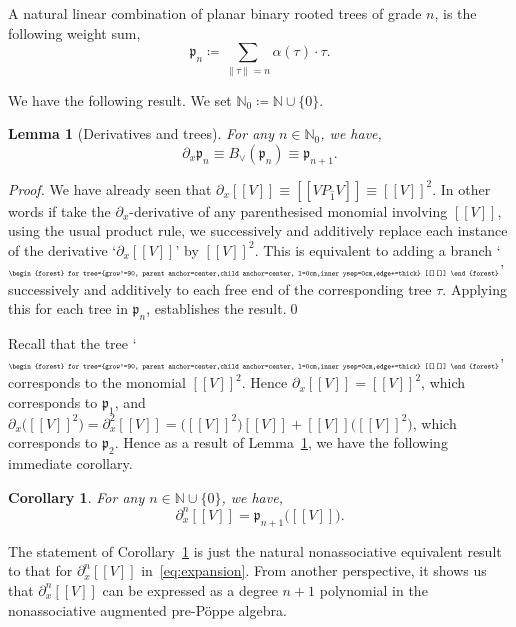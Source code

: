 \documentclass[5p,twocolumn]{elsarticle}
\newcommand*{\pa}{{\partial}}
\newcommand*{\lb}{[\![}
\newcommand*{\rb}{]\!]}
\newcommand*{\pf}{\mathfrak p}
\newtheorem{lemma}[theorem]{Lemma}
\newtheorem{corollary}[theorem]{Corollary}
\begin{document}
\begin{definition}\label{def:weightedpolytrees}
  A natural linear combination of planar binary rooted trees of grade $n$, is the following weight sum,
  \begin{equation}\label{eq:weightedpolytrees}
    \pf_n\coloneqq\sum_{\|\tau\|=n}\alpha(\tau)\cdot\tau.
  \end{equation}
\end{definition}
%
We have the following result. We set $\mathbb N_0\coloneqq\mathbb N\cup\{0\}$.
%
\begin{lemma}[Derivatives and trees]\label{lemma:derivativesandtrees}
  For any $n\in\mathbb N_0$, we have,
  \begin{equation*}
        \pa_x\pf_n\equiv B_{\vee}(\pf_n)\equiv\pf_{n+1}.
  \end{equation*}
\end{lemma}
%
\begin{proof}
  We have already seen that $\pa_x\lb V\rb\equiv \lb VP_{\hat 1}V\rb\equiv\lb V\rb^2$.
  In other words if take the $\pa_x$-derivative of any parenthesised monomial involving $\lb V\rb$, using the usual product rule,
  we successively and additively replace each instance of the derivative `$\pa_x\lb V\rb$' by $\lb V\rb^2$.
  This is equivalent to adding a branch `${\tiny \begin{forest} for tree={grow'=90, parent anchor=center,child anchor=center, l=0cm,inner ysep=0cm,edge+=thick} [[][]] \end{forest}}$'
  successively and additively to each free end of the corresponding tree $\tau$. Applying this for each tree in $\pf_n$, establishes the result.\qed
\end{proof}
%
Recall that the tree `${\tiny \begin{forest} for tree={grow'=90, parent anchor=center,child anchor=center, l=0cm,inner ysep=0cm,edge+=thick} [[][]] \end{forest}}$' corresponds to the monomial $\lb V\rb^2$.
Hence $\pa_x\lb V\rb=\lb V\rb^2$, which corresponds to $\pf_1$, and $\pa_x\bigl(\lb V\rb^2\bigr)=\pa_x^2\lb V\rb=\bigl(\lb V\rb^2\bigr)\lb V\rb+\lb V\rb\bigl(\lb V\rb^2\bigr)$, which corresponds to $\pf_2$. 
Hence as a result of Lemma~\ref{lemma:derivativesandtrees}, we have the following immediate corollary.
%
\begin{corollary}\label{cor:derivsandtrees}
  For any $n\in\mathbb N\cup\{0\}$, we have,
   \begin{equation*}
        \pa_x^n\lb V\rb=\pf_{n+1}\bigl(\lb V\rb\bigr).
   \end{equation*}
\end{corollary}
%
\begin{remark}\label{rmk:nonassocpPa}
  The statement of Corollary~\ref{cor:derivsandtrees} is just the natural nonassociative equivalent result to that for $\pa_x^n\lb V\rb$ in~\eqref{eq:expansion}.
  From another perspective, it shows us that $\pa_x^n\lb V\rb$ can be expressed as a degree $n+1$ polynomial in the nonassociative augmented pre-P\"oppe algebra.
\end{remark}
\end{document}
